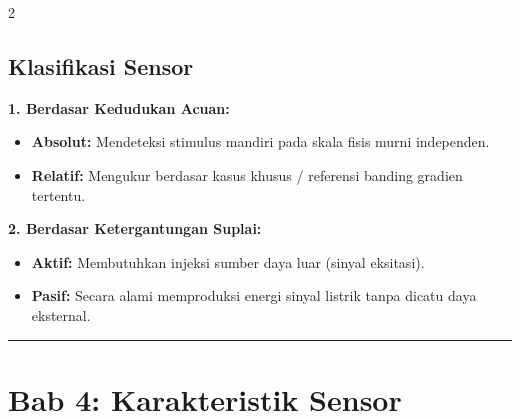 \documentclass[10pt]{article}
\begin{document}
\begin{multicols}{2}
\subsection*{Klasifikasi Sensor}
\textbf{1. Berdasar Kedudukan Acuan:}
\begin{itemize}
    \item \textbf{Absolut:} Mendeteksi stimulus mandiri pada skala fisis murni independen.
    \item \textbf{Relatif:} Mengukur berdasar kasus khusus / referensi banding gradien tertentu.
\end{itemize}

\textbf{2. Berdasar Ketergantungan Suplai:}
\begin{itemize}
    \item \textbf{Aktif:} Membutuhkan injeksi sumber daya luar (sinyal eksitasi).
    \item \textbf{Pasif:} Secara alami memproduksi energi sinyal listrik tanpa dicatu daya eksternal.
\end{itemize}

\noindent\rule{\columnwidth}{0.4pt}

\section*{Bab 4: Karakteristik Sensor}
\label{bab4}


\end{multicols}
\end{document}
